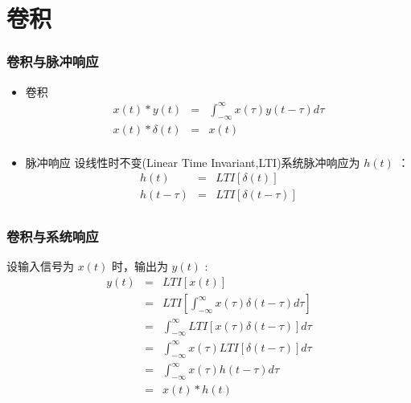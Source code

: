 \documentclass{beamer}
\begin{document}
\section{卷积}
\label{sec-4}
\begin{frame}
\frametitle{卷积与脉冲响应}
\label{sec-4-1}

\begin{itemize}
\item 卷积
      \begin{eqnarray*}
      x(t)*y(t) &=& \int_{-\infty}^{\infty}x(\tau)y(t-\tau)d\tau \\
      x(t)*\delta(t)& = & x(t) \\
      \end{eqnarray*}
\item 脉冲响应
     设线性时不变(Linear Time Invariant,LTI)系统脉冲响应为 $h(t)$ ：
      \begin{eqnarray*}
      h(t) &=& LTI[\delta(t)]\\
      h(t-\tau) &=& LTI[\delta(t-\tau)]\\
      \end{eqnarray*}
\end{itemize}
\end{frame}
\begin{frame}
\frametitle{卷积与系统响应}
\label{sec-4-2}

设输入信号为 $x(t)$ 时，输出为 $y(t)$ :
\begin{eqnarray*}
y(t) & =& LTI[x(t)]\\
     &=& LTI\left[\int_{-\infty}^{\infty}x(\tau)\delta(t-\tau)d\tau\right] \\
     &=& \int_{-\infty}^{\infty} LTI[x(\tau)\delta(t-\tau)]d\tau \\
     &=& \int_{-\infty}^{\infty} x(\tau)LTI[\delta(t-\tau)]d\tau \\
     &=& \int_{-\infty}^{\infty} x(\tau) h(t-\tau)d\tau \\
     &=& x(t) * h(t)
\end{eqnarray*}
\end{frame}
\end{document}
